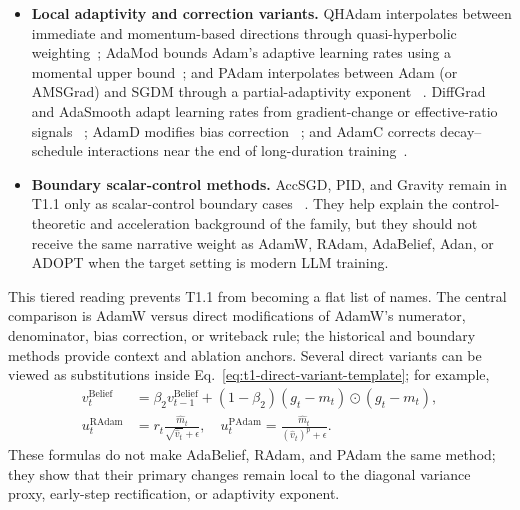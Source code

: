 \begin{itemize}
  ~\citep{zhuang2020adabelief}.  Adan adds a Nesterov-inspired
  gradient-difference channel using both $g_t$ and $g_t-g_{t-1}$
  ~\citep{xie2022adan}.  ADOPT changes the ordering of second-moment update and
  normalization to obtain guarantees for arbitrary $\beta_2$
  ~\citep{taniguchi2024adopt}.  EXAdam adds adaptive cross-moment debiasing and
  gradient-based acceleration while remaining a direct Adam extension
  ~\citep{adly2024exadam}.
  \item \textbf{Local adaptivity and correction variants.}  QHAdam interpolates
  between immediate and momentum-based directions through quasi-hyperbolic
  weighting~\citep{ma2019qhadam}; AdaMod bounds Adam's adaptive learning rates
  using a momental upper bound~\citep{ding2019adamod}; and PAdam interpolates
  between Adam (or AMSGrad) and SGDM through a partial-adaptivity exponent
  ~\citep{chen2018padam}.  DiffGrad and AdaSmooth adapt learning rates from
  gradient-change or effective-ratio signals
  ~\citep{dubey2019diffgrad,lu2023adasmooth}; AdamD modifies bias correction
  ~\citep{john2021adamd}; and AdamC corrects decay--schedule interactions near
  the end of long-duration training~\citep{defazio2025gradients}.
  \item \textbf{Boundary scalar-control methods.}  AccSGD, PID, and Gravity
  remain in T1.1 only as scalar-control boundary cases
  ~\citep{kidambi2018insufficiency,an2018pid,bahrami2021gravity}.  They help
  explain the control-theoretic and acceleration background of the family, but
  they should not receive the same narrative weight as AdamW, RAdam, AdaBelief,
  Adan, or ADOPT when the target setting is modern LLM training.
\end{itemize}

This tiered reading prevents T1.1 from becoming a flat list of names.  The
central comparison is AdamW versus direct modifications of AdamW's numerator,
denominator, bias correction, or writeback rule; the historical and boundary
methods provide context and ablation anchors.  Several direct variants can be
viewed as substitutions inside Eq.~\eqref{eq:t1-direct-variant-template}; for
example,
\begin{align}
  v_t^{\mathrm{Belief}}
    &= \beta_2 v_{t-1}^{\mathrm{Belief}}
       + (1-\beta_2)(g_t-m_t)\odot(g_t-m_t), \\
  u_t^{\mathrm{RAdam}}
    &= r_t \frac{\hat{m}_t}{\sqrt{\hat{v}_t}+\epsilon}, \quad
  u_t^{\mathrm{PAdam}}
    = \frac{\hat{m}_t}{(\hat{v}_t)^p+\epsilon}.
  \label{eq:t1-direct-substitutions}
\end{align}
These formulas do not make AdaBelief, RAdam, and PAdam the same method; they
show that their primary changes remain local to the diagonal variance proxy,
early-step rectification, or adaptivity exponent.

